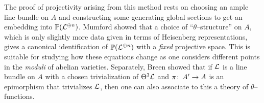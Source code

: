 \begin{remark}
The proof of projectivity arising from this method rests on choosing an ample line bundle on $A$ and constructing some generating global sections to get an embedding into $\mathbb{P}(\mathcal{L}^{\oplus n})$.  Mumford showed that a choice of ``$\theta$--structure'' on $A$, which is only slightly more data given in terms of Heisenberg representations, gives a canonical identification of $\mathbb{P}(\mathcal{L}^{\oplus n})$ with a \emph{fixed} projective space.  This is suitable for studying how these equations change as one considers different points in the \emph{moduli} of abelian varieties.  Separately, Breen showed that if $\mathcal{L}$ is a line bundle on $A$ with a chosen trivialization of $\Theta^3 \mathcal{L}$ and $\pi\colon\thinspace A' \to A$ is an epimorphism that trivializes $\mathcal{L}$, then one can also associate to this a theory of $\theta$--functions.
\end{remark}









